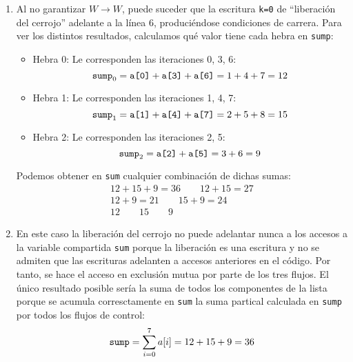 \begin{ejercicio}
    \begin{enumerate}
        \item Al no garantizar $W\rightarrow W$, puede suceder que la escritura \verb|k=0| de ``liberación del cerrojo'' adelante a la línea 6, produciéndose condiciones de carrera. Para ver los distintos resultados, calculamos qué valor tiene cada hebra en \verb|sump|:
            \begin{itemize}
                \item Hebra 0: Le corresponden las iteraciones 0, 3, 6: 
                    \begin{equation*}
                        \verb|sump|_0 = \verb|a[0]| + \verb|a[3]| + \verb|a[6]| = 1+4+7 = 12
                    \end{equation*}
                \item Hebra 1: Le corresponden las iteraciones 1, 4, 7:
                    \begin{equation*}
                        \verb|sump|_1 = \verb|a[1]| + \verb|a[4]| + \verb|a[7]| = 2+5+8 = 15
                    \end{equation*}
                \item Hebra 2: Le corresponden las iteraciones 2, 5:
                    \begin{equation*}
                        \verb|sump|_2 = \verb|a[2]| + \verb|a[5]| = 3+6=9
                    \end{equation*}
            \end{itemize}
            Podemos obtener en \verb|sum| cualquier combinación de dichas sumas:
            \begin{gather*}
                12+15+9 = 36 \qquad 12+15 = 27 \\
                12+9 = 21 \qquad 15+9 = 24 \\
                12 \qquad 15 \qquad 9
            \end{gather*}
        \item En este caso la liberación del cerrojo no puede adelantar nunca a los accesos a la variable compartida \verb|sum| porque la liberación es una escritura y no se admiten que las escrituras adelanten a accesos anteriores en el código. Por tanto, se hace el acceso en exclusión mutua por parte de los tres flujos. El único resultado posible sería la suma de todos los componentes de la lista porque se acumula corresctamente en \verb|sum| la suma partical calculada en \verb|sump| por todos los flujos de control:
            \begin{equation*}
                \verb|sump| = \sum_{i=0}^{7} a[i] = 12 + 15 + 9 = 36
            \end{equation*}
    \end{enumerate}
\end{ejercicio}

